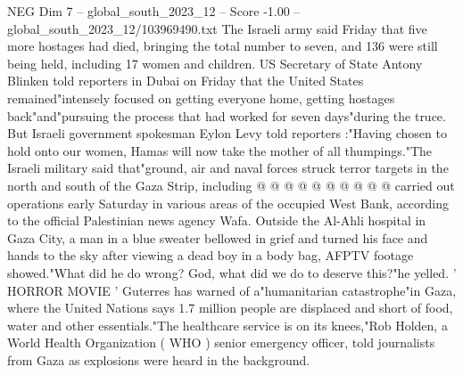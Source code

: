 \begin{textsample}{NEG Dim 7 – global\_south\_2023\_12 – Score -1.00 – global\_south\_2023\_12/103969490.txt}
The Israeli army said Friday that five more hostages had died, bringing the total number to seven, and 136 were still being held, including 17 women and children.
US Secretary of State Antony Blinken told reporters in Dubai on Friday that the United States remained"intensely focused on getting everyone home, getting hostages back"and"pursuing the process that had worked for seven days"during the truce.
But Israeli government spokesman Eylon Levy told reporters :"Having chosen to hold onto our women, Hamas will now take the mother of all thumpings."The Israeli military said that"ground, air and naval forces struck terror targets in the north and south of the Gaza Strip, including @ @ @ @ @ @ @ @ @ @ carried out operations early Saturday in various areas of the occupied West Bank, according to the official Palestinian news agency Wafa.
Outside the Al-Ahli hospital in Gaza City, a man in a blue sweater bellowed in grief and turned his face and hands to the sky after viewing a dead boy in a body bag, AFPTV footage showed."What did he do wrong?
God, what did we do to deserve this?"he yelled. ' HORROR MOVIE ' Guterres has warned of a"humanitarian catastrophe"in Gaza, where the United Nations says 1.7 million people are displaced and short of food, water and other essentials."The healthcare service is on its knees,"Rob Holden, a World Health Organization ( WHO ) senior emergency officer, told journalists from Gaza as explosions were heard in the background.

\end{textsample}
